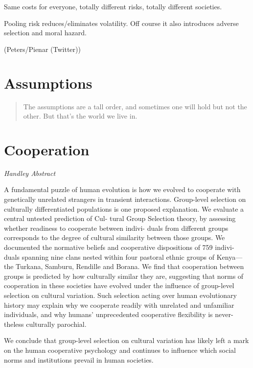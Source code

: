 \documentclass[
]{book}
\begin{document}
Same costs for everyone, totally different risks, totally different societies.

Pooling risk reduces/eliminates volatility.
Off course it also introduces adverse selection and moral hazard.

(Peters/Pienar (Twitter))

\hypertarget{assumptions}{%
\chapter{Assumptions}\label{assumptions}}

\begin{quote}
The assumptions are a tall order, and sometimes one will hold but not the other. But that's the world we live in.
\end{quote}

\hypertarget{cooperation}{%
\chapter{Cooperation}\label{cooperation}}

\emph{Handley Abstract}

A fundamental puzzle of human evolution is how we evolved to cooperate with genetically
unrelated strangers in transient interactions. Group-level selection on culturally differentiated
populations is one proposed explanation. We evaluate a central untested prediction of Cul-
tural Group Selection theory, by assessing whether readiness to cooperate between indivi-
duals from different groups corresponds to the degree of cultural similarity between those
groups. We documented the normative beliefs and cooperative dispositions of 759 indivi-
duals spanning nine clans nested within four pastoral ethnic groups of Kenya---the Turkana,
Samburu, Rendille and Borana. We find that cooperation between groups is predicted by how
culturally similar they are, suggesting that norms of cooperation in these societies have
evolved under the influence of group-level selection on cultural variation. Such selection
acting over human evolutionary history may explain why we cooperate readily with unrelated
and unfamiliar individuals, and why humans' unprecedented cooperative flexibility is never-
theless culturally parochial.

We conclude that group-level selection on cultural variation
has likely left a mark on the human cooperative psychology and
continues to influence which social norms and institutions prevail
in human societies.
\end{document}

